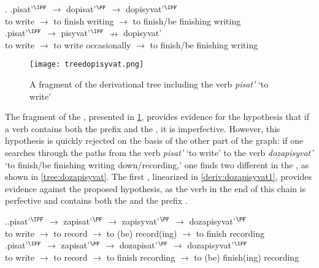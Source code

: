 \ex.\label{deriv1} \ag.\label{deriv1-1}pisat'$^\IPF$ $\rightarrow$ dopisat'$^\PF$ $\rightarrow$ dopisyvat'$^\IPF$\\
{to write} $\rightarrow$ {to finish writing} $\rightarrow$ {to finish/be finishing writing}\\
\bg.\label{deriv1-2}pisat'$^\IPF$ $\rightarrow$ pisyvat'$^\IPF$ $\nrightarrow$ dopisyvat'\\
{to write} $\rightarrow$ {to write occasionally} $\rightarrow$ {to finish/be finishing writing}\\

\begin{figure}
\begin{center}
\texttt{[image: treedopisyvat.png]}
\caption{A fragment of the derivational tree including the verb \textit{pisat'} `to write'\label{tree:dopisyvat}}
\end{center}
\end{figure}

The fragment of the , presented in \ref{tree:dopisyvat}, provides evidence for the hypothesis that if a verb contains both the prefix  and the , it is imperfective. However, this hypothesis is quickly rejected on the basis of the other part of the graph: if one searches through the paths from the verb {\it pisat'} `to write' to the verb {\it dozapisyvat'} `to finish/be finishing writing down/recording,' one finds two different  in the , as shown in \ref{tree:dozapisyvat}. The first , linearized in \ref{deriv:dozapisyvat1}, provides evidence against the proposed hypothesis, as the verb in the end of this chain is perfective and contains both the  and the prefix . 

\ex.\label{deriv:dozapisyvat}\ag.\label{deriv:dozapisyvat1}pisat'$^\IPF$ $\rightarrow$ zapisat'$^\PF$ $\rightarrow$ zapisyvat'$^\PF$ $\rightarrow$ dozapisyvat'$^\PF$\\
{to write} $\rightarrow$ {to record} $\rightarrow$ {to (be) record(ing)} $\rightarrow$ {to finish recording}\\
\bg.\label{deriv:dozapisyvat2}pisat'$^\IPF$ $\rightarrow$ zapisat'$^\PF$ $\rightarrow$ dozapisat'$^\PF$ $\rightarrow$ dozapisyvat'$^\IPF$\\
{to write} $\rightarrow$ {to record} $\rightarrow$ {to finish recording} $\rightarrow$ {to (be) finish(ing) recording}\\				

